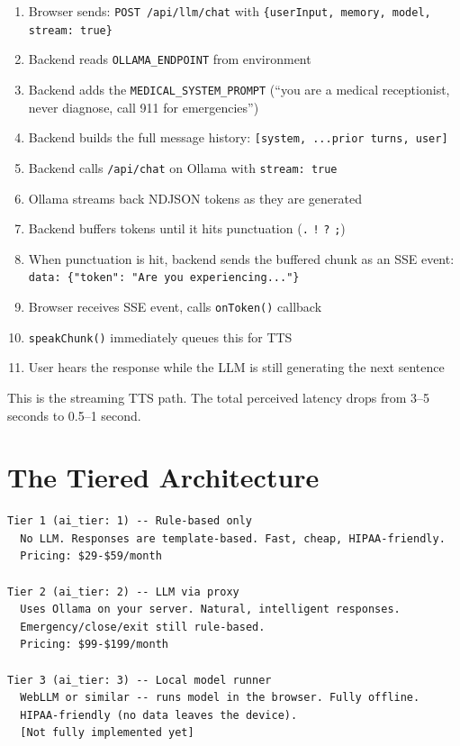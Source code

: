 \documentclass[12pt, a4paper]{report}
\newcommand{\ic}[1]{\texttt{\small\color{accentblue!70!black}#1}}
\begin{document}
\begin{enumerate}
  \item Browser sends: \ic{POST /api/llm/chat} with \ic{\{userInput, memory, model, stream: true\}}
  \item Backend reads \ic{OLLAMA\_ENDPOINT} from environment
  \item Backend adds the \ic{MEDICAL\_SYSTEM\_PROMPT} (``you are a medical
        receptionist, never diagnose, call 911 for emergencies'')
  \item Backend builds the full message history:
        \ic{[system, ...prior turns, user]}
  \item Backend calls \ic{/api/chat} on Ollama with \ic{stream: true}
  \item Ollama streams back NDJSON tokens as they are generated
  \item Backend buffers tokens until it hits punctuation
        (\ic{.} \ic{!} \ic{?} \ic{;})
  \item When punctuation is hit, backend sends the buffered chunk as an SSE event:
        \ic{data: \{"token": "Are you experiencing..."\}}
  \item Browser receives SSE event, calls \ic{onToken()} callback
  \item \ic{speakChunk()} immediately queues this for TTS
  \item User hears the response while the LLM is still generating the next sentence
\end{enumerate}

This is the streaming TTS path. The total perceived latency drops from 3--5 seconds to
0.5--1 second.

\section{The Tiered Architecture}

\begin{lstlisting}
Tier 1 (ai_tier: 1) -- Rule-based only
  No LLM. Responses are template-based. Fast, cheap, HIPAA-friendly.
  Pricing: $29-$59/month

Tier 2 (ai_tier: 2) -- LLM via proxy
  Uses Ollama on your server. Natural, intelligent responses.
  Emergency/close/exit still rule-based.
  Pricing: $99-$199/month

Tier 3 (ai_tier: 3) -- Local model runner
  WebLLM or similar -- runs model in the browser. Fully offline.
  HIPAA-friendly (no data leaves the device).
  [Not fully implemented yet]
\end{lstlisting}
\end{document}
